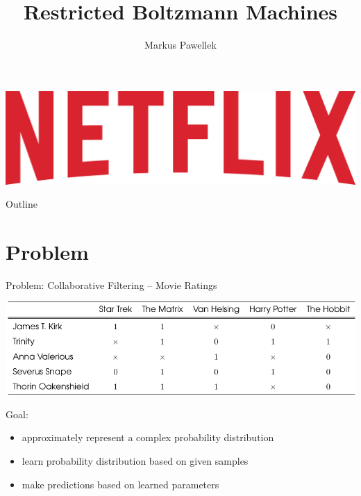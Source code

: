 \documentclass[aspectratio=169]{beamer}
\title{Restricted Boltzmann Machines}
\author{Markus Pawellek}
\begin{document}
  \renewcommand{\separate}{\qquad}

  \begin{frame}
    \vfill
    \includegraphics[width=\textwidth]{images/netflix-logo.jpg}
    \vfill
  \end{frame}

  \frame{\titlepage}
  \begin{frame}{Outline}
    \footnotesize
    \hfill\parbox[t][7cm][l]{0.9\textwidth}{\tableofcontents}
  \end{frame}

  \section{Problem} %
  \label{sec:Problem}
    \begin{frame}{Problem: Collaborative Filtering -- Movie Ratings}
      \begin{center}
        \includegraphics[height=0.35\textheight]{figures/problem-example.pdf}
      \end{center}
      \vfill
      \pause
      Goal:
      \begin{itemize}
        \pause
        \item approximately represent a complex probability distribution
        \pause
        \item learn probability distribution based on given samples
        \pause
        \item make predictions based on learned parameters
      \end{itemize}
    \end{frame}
\end{document}
